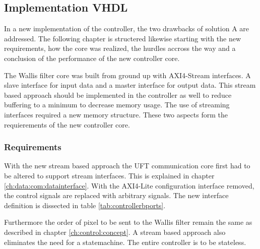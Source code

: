 \subsection{Implementation VHDL} \label{ch:controller:vhdl}
In a new implementation of the controller, the two drawbacks of solution A are
addressed. The following chapter is structered likewise starting with the new
requirements, how the core was realized, the hurdles accross the way and a
conclusion of the performance of the new controller core.

The Wallis filter core was built from ground up with AXI4-Stream interfaces. A
slave interface for input data and a master interface for output data. This
stream based approach should be implemented in the controller as well to reduce
buffering to a minimum to decrease memory usage. The use of streaming interfaces
required a new memory structure. These two aspects form the requierements of the
new controller core.

\subsubsection*{Requirements}
With the new stream based approach the UFT communication core first had to be
altered to support stream interfaces. This is explained in chapter 
\ref{ch:data:com:datainterface}. With the AXI4-Lite configuration interface
removed, the
control signals are replaced with arbitrary signals. The new interface
definition is dissected in table \ref{tab:controllerbports}.

Furthermore the order of pixel to be sent to the Wallis filter remain the same
as described in chapter \ref{ch:control:concept}. A stream based approach also eliminates the need for a statemachine. The entire
controller is to be stateless.

